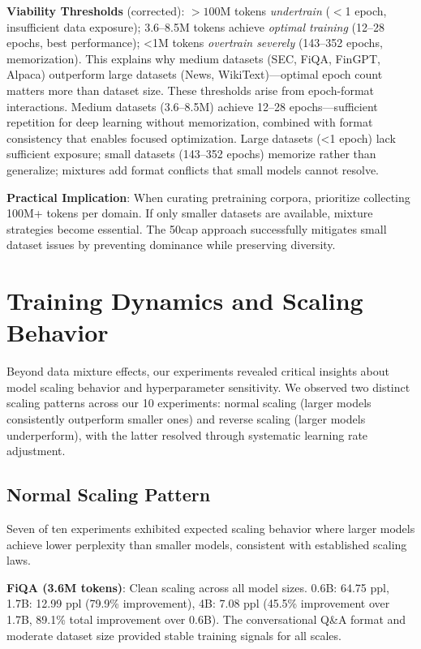 \textbf{Viability Thresholds} (corrected): \(>100\)M tokens \textit{undertrain} ($<$1 epoch, insufficient data exposure); 3.6–8.5M tokens achieve \textit{optimal training} (12–28 epochs, best performance); <1M tokens \textit{overtrain severely} (143–352 epochs, memorization). This explains why medium datasets (SEC, FiQA, FinGPT, Alpaca) outperform large datasets (News, WikiText)—optimal epoch count matters more than dataset size. These thresholds arise from epoch-format interactions. Medium datasets (3.6–8.5M) achieve 12–28 epochs—sufficient repetition for deep learning without memorization, combined with format consistency that enables focused optimization. Large datasets (<1 epoch) lack sufficient exposure; small datasets (143–352 epochs) memorize rather than generalize; mixtures add format conflicts that small models cannot resolve.

\textbf{Practical Implication}: When curating pretraining corpora, prioritize collecting 100M+ tokens per domain. If only smaller datasets are available, mixture strategies become essential. The 50cap approach successfully mitigates small dataset issues by preventing dominance while preserving diversity.

\section{Training Dynamics and Scaling Behavior}

Beyond data mixture effects, our experiments revealed critical insights about model scaling behavior and hyperparameter sensitivity. We observed two distinct scaling patterns across our 10 experiments: normal scaling (larger models consistently outperform smaller ones) and reverse scaling (larger models underperform), with the latter resolved through systematic learning rate adjustment.

\subsection{Normal Scaling Pattern}

Seven of ten experiments exhibited expected scaling behavior where larger models achieve lower perplexity than smaller models, consistent with established scaling laws.

\textbf{FiQA (3.6M tokens)}: Clean scaling across all model sizes. 0.6B: 64.75 ppl, 1.7B: 12.99 ppl (79.9\% improvement), 4B: 7.08 ppl (45.5\% improvement over 1.7B, 89.1\% total improvement over 0.6B). The conversational Q\&A format and moderate dataset size provided stable training signals for all scales.

